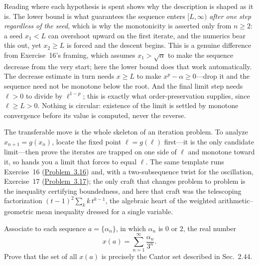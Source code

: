 \documentclass[main.tex]{subfiles}
\begin{document}
\begin{Reflection}
Reading where each hypothesis is spent shows why the description is shaped as it is. The lower bound is
what guarantees the sequence enters $[L,\infty)$ \emph{after one step regardless of the seed}, which is why
the monotonicity is asserted only from $n\ge 2$: a seed $x_{1}<L$ can overshoot upward on the first
iterate, and the numerics bear this out, yet $x_{2}\ge L$ is forced and the descent begins. This is a
genuine difference from Exercise~16's framing, which assumes $x_{1}>\sqrt\alpha$ to make the sequence
decrease from the very start; here the lower bound does that work automatically. The decrease estimate in
turn needs $x\ge L$ to make $x^{p}-\alpha\ge 0$---drop it and the sequence need not be monotone below the
root. And the final limit step needs $\ell>0$ to divide by $\ell^{1-p}$; this is exactly what
order-preservation supplies, since $\ell\ge L>0$. Nothing is circular: existence of the limit is settled by
monotone convergence before its value is computed, never the reverse.

The transferable move is the whole skeleton of an iteration problem. To analyze $x_{n+1}=g(x_{n})$, locate
the fixed point $\ell=g(\ell)$ first---it is the only candidate limit---then prove the iterates are trapped
on one side of $\ell$ and monotone toward it, so  hands you a
limit that  forces to equal $\ell$. The same template runs
Exercise~16 (\hyperlink{prob:3.16}{Problem~3.16}) and, with a two-subsequence twist for the oscillation,
Exercise~17 (\hyperlink{prob:3.17}{Problem~3.17}); the only craft that changes problem to problem is the
inequality certifying boundedness, and here that craft was the telescoping factorization
$(t-1)^{2}\sum_{k}k\,t^{k-1}$, the algebraic heart of the weighted arithmetic--geometric mean inequality
dressed for a single variable.
\end{Reflection}

Associate to each sequence $a = \{\alpha_{n}\}$, in which $\alpha_{n}$ is $0$ or $2$, the real number
\[
x(a) = \sum_{n=1}^{\infty} \frac{\alpha_{n}}{3^{n}}.
\]
Prove that the set of all $x(a)$ is precisely the Cantor set described in Sec.\ 2.44.
\end{document}
